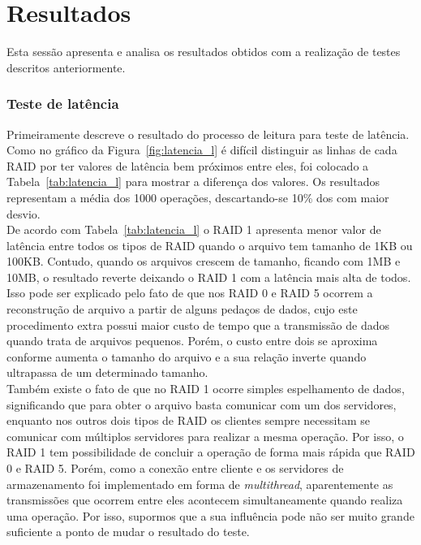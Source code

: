 
	\section{Resultados}
	Esta sessão apresenta e analisa os resultados obtidos com a realização de testes descritos anteriormente.
	\\
	
	\subsubsection{Teste de latência}
	Primeiramente descreve o resultado do processo de leitura para teste de latência.
	Como no gráfico da Figura~\ref{fig:latencia_l} é difícil distinguir as linhas de cada RAID por ter valores de latência bem próximos entre eles, foi colocado a Tabela~\ref{tab:latencia_l} para mostrar a diferença dos valores.
	Os resultados representam a média dos 1000 operações, descartando-se 10\% dos com maior desvio.
	 \\
	 
	De acordo com Tabela~\ref{tab:latencia_l} o RAID 1 apresenta menor valor de latência entre todos os tipos de RAID quando o arquivo tem tamanho de 1KB ou 100KB. Contudo, quando os arquivos crescem de tamanho, ficando com 1MB e 10MB, o resultado reverte deixando o RAID 1 com a latência mais alta de todos. 
	Isso pode ser explicado pelo fato de que nos RAID 0 e RAID 5 ocorrem a reconstrução de arquivo a partir de alguns pedaços de dados, cujo este procedimento extra possui maior custo de tempo que a transmissão de dados quando trata de arquivos pequenos. Porém, o custo entre dois se aproxima conforme aumenta o tamanho do arquivo e a sua relação inverte quando ultrapassa de um determinado tamanho.
	\\
	
	Também existe o fato de que no RAID 1 ocorre simples espelhamento de dados, significando que para obter o arquivo basta comunicar com um dos servidores, enquanto nos outros dois tipos de RAID os clientes sempre necessitam se comunicar com múltiplos servidores para realizar a mesma operação. Por isso, o RAID 1 tem possibilidade de concluir a operação de forma mais rápida que RAID 0 e RAID 5. Porém, como a conexão entre cliente e os servidores de armazenamento foi implementado em forma de \textit{multithread}, aparentemente as transmissões que ocorrem entre eles acontecem simultaneamente quando realiza uma operação. Por isso, supormos que a sua influência pode não ser muito grande suficiente a ponto de mudar o resultado do teste.
	\\
	
